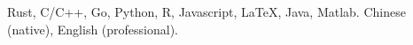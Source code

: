 \begin{cvskills}

   {Rust, C/C++, Go, Python, R, Javascript, \LaTeX, Java,
    Matlab.}
   {Chinese (native), English (professional).}

\end{cvskills}

